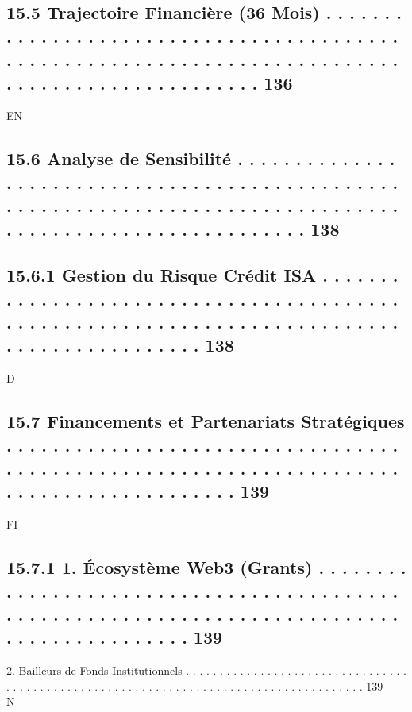 \subsection{15.5    Trajectoire Financière (36 Mois) . . . . . . . . . . . . . . . . . . . . . . . . . . . . . . . . . . . . . . . . . . . . . . . . . . . . . . . . . . . . . . . . . . . . . . . . . . . . . . . . . . . . . . . . . . . . . . . . . 136}
\vspace{0.5em}
\vspace{0.5em}
\vspace{0.5em}
\vspace{0.5em}
EN\\
\subsection{15.6    Analyse de Sensibilité . . . . . . . . . . . . . . . . . . . . . . . . . . . . . . . . . . . . . . . . . . . . . . . . . . . . . . . . . . . . . . . . . . . . . . . . . . . . . . . . . . . . . . . . . . . . . . . . . . . . . . . . . . . . 138}
\subsection{15.6.1              Gestion du Risque Crédit ISA . . . . . . . . . . . . . . . . . . . . . . . . . . . . . . . . . . . . . . . . . . . . . . . . . . . . . . . . . . . . . . . . . . . . . . . . . . . . . . . . . . . . . . . . . . . . 138}
\vspace{0.5em}
\vspace{0.5em}
\vspace{0.5em}
\vspace{0.5em}
D\\
\subsection{15.7    Financements et Partenariats Stratégiques . . . . . . . . . . . . . . . . . . . . . . . . . . . . . . . . . . . . . . . . . . . . . . . . . . . . . . . . . . . . . . . . . . . . . . . . . . . . . . . . . . . . . . . . 139}
\vspace{0.5em}
\vspace{0.5em}
\vspace{0.5em}
\vspace{0.5em}
FI\\
\subsection{15.7.1             1. Écosystème Web3 (Grants) . . . . . . . . . . . . . . . . . . . . . . . . . . . . . . . . . . . . . . . . . . . . . . . . . . . . . . . . . . . . . . . . . . . . . . . . . . . . . . . . . . . . . . . . . . . . 139}
2. Bailleurs de Fonds Institutionnels . . . . . . . . . . . . . . . . . . . . . . . . . . . . . . . . . . . . . . . . . . . . . . . . . . . . . . . . . . . . . . . . . . . . . . . . . . . . . . . . . . . . . . 139\\
N\\
